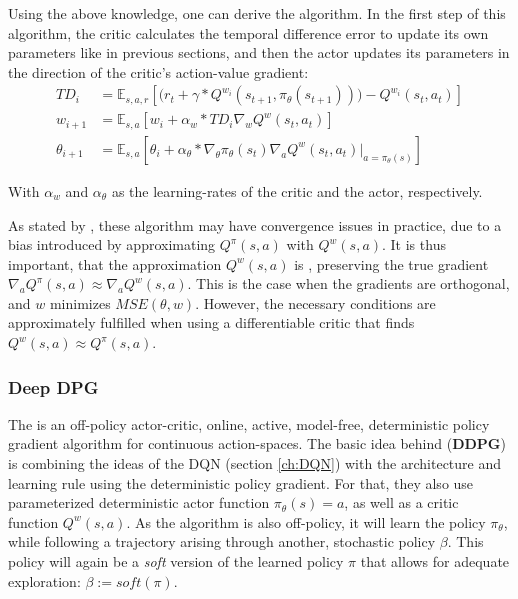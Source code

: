 \noindent Using the above knowledge, one can derive the  algorithm. In the first step of this algorithm, the critic calculates the temporal difference error to update its own parameters like in previous sections, and then the actor updates its parameters in the direction of the critic's action-value gradient:
\begin{align}
	TD_i    &= \mathds{E}_{s,a,r} \left[ \big( r_t + \gamma * Q^{w_i}(s_{t+1}, \pi_{\theta}(s_{t+1})) \big) - Q^{w_i}(s_t, a_t) \right] \label{eq:td_dpg}\\
	w_{i+1} &= \mathds{E}_{s,a} \left[  w_i + \alpha_w * TD_i \nabla_w Q^w(s_t, a_t) \right] \label{eq:critic_dpg} \\
	\theta_{i+1} &= \mathds{E}_{s,a} \left[ \theta_i + \alpha_\theta * \nabla_\theta \pi_\theta(s_t) \nabla_a Q^w(s_t,a_t) \big|_{a=\pi_\theta(s)} \right] \label{eq:actor_dpg}
\end{align}
\begin{flushright} \small With $\alpha_w$ and $\alpha_\theta$ as the learning-rates of the critic and the actor, respectively. \end{flushright}

As stated by \cite{silver_deterministic_2014}, these algorithm may have convergence issues in practice, due to a bias introduced by approximating $Q^\pi(s,a)$ with $Q^w(s,a)$. It is thus important, that the approximation $Q^w(s,a)$ is , preserving the true gradient $\nabla_a Q^\pi(s,a) \approx \nabla_a Q^w(s,a)$. This is the case when the gradients are orthogonal, and $w$ minimizes $MSE(\theta,w)$. However, the necessary conditions are approximately fulfilled when using a differentiable critic that finds $Q^w(s,a) \approx Q^\pi(s,a)$.


\subsubsection*{Deep DPG} \label{ch:ddpg}

The  is an off-policy actor-critic, online, active, model-free, deterministic policy gradient algorithm for continuous action-spaces. The basic idea behind  (\textbf{DDPG})\cite{lillicrap_continuous_2015} is combining the ideas of the DQN (section \ref{ch:DQN}) with the architecture and learning rule using the deterministic policy gradient. For that, they also use parameterized deterministic actor function $\pi_\theta(s) = a$, as well as a critic function $Q^w(s,a)$. As the algorithm is also off-policy, it will learn the policy $\pi_\theta$, while following a trajectory arising through another, stochastic policy $\beta$. This policy will again be a \textit{soft} version of the learned policy $\pi$ that allows for adequate exploration: $\beta := soft(\pi)$.

